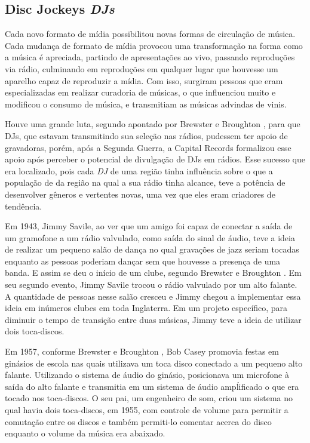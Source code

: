 \subsection{Disc Jockeys \textit{DJs}}
Cada novo formato de mídia possibilitou novas formas de circulação de música. Cada mudança de formato de mídia provocou uma transformação na forma como a música é apreciada, partindo de apresentações ao vivo, passando reproduções via rádio, culminando em reproduções em qualquer lugar que houvesse um aparelho capaz de reproduzir a mídia. Com isso, surgiram pessoas que eram especializadas em realizar curadoria de músicas, o que influenciou muito e modificou o consumo de música, e transmitiam as músicas advindas de vinis.
\par
Houve uma grande luta, segundo apontado por Brewster e Broughton \cite{lastnight}, para que DJs, que estavam transmitindo sua seleção nas rádios, pudessem ter apoio de gravadoras, porém, após a Segunda Guerra, a Capital Records formalizou esse apoio após perceber o potencial de divulgação de DJs em rádios. Esse sucesso que era localizado, pois cada \textit{DJ} de uma região tinha influência sobre o que a população de da região na qual a sua rádio tinha alcance, teve a potência de desenvolver gêneros e vertentes novas, uma vez que eles eram criadores de tendência. 
\par
Em 1943, Jimmy Savile, ao ver que um amigo foi capaz de conectar a saída de um gramofone a um rádio valvulado, como saída do sinal de áudio, teve a ideia de realizar um pequeno salão de dança no qual gravações de jazz seriam tocadas enquanto as pessoas poderiam dançar sem que houvesse a presença de uma banda. E assim se deu o início de um clube, segundo Brewster e Broughton \cite{lastnight}. Em seu segundo evento, Jimmy Savile trocou o rádio valvulado por um alto falante. A quantidade de pessoas nesse salão cresceu e Jimmy chegou a implementar essa ideia em inúmeros clubes em toda Inglaterra. Em um projeto específico, para diminuir o tempo de transição entre duas músicas, Jimmy teve a ideia de utilizar dois toca-discos.
\par
Em 1957, conforme Brewster e Broughton \cite{lastnight}, Bob Casey promovia festas em ginásios de escola nas quais utilizava um toca disco conectado a um pequeno alto falante. Utilizando o sistema de áudio do ginásio, posicionava um microfone à saída do alto falante e transmitia em um sistema de áudio ampĺificado o que era tocado nos toca-discos. O seu pai, um engenheiro de som, criou um sistema no qual havia dois toca-discos, em 1955, com controle de volume para permitir a comutação entre os discos e também permiti-lo comentar acerca do disco enquanto o volume da música era abaixado.
